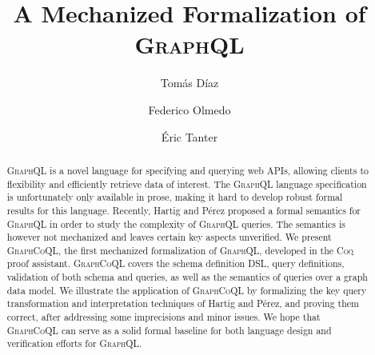 \documentclass[sigplan,10pt,anonymous,review,nonacm,screen]{acmart}
\newcommand{\plstyle}[1]{\mbox{\textsc{#1}}\xspace}
\newcommand{\gql}{\plstyle{GraphQL}}
\newcommand{\gcoql}{\plstyle{GraphCoQL}}
\newcommand{\coq}{\plstyle{Coq}}
\begin{document}
\title{A Mechanized Formalization of \gql}
\author{Tomás Díaz}

\author{Federico Olmedo}
\author{Éric Tanter}

\begin{abstract}
\gql is a novel language for specifying and querying web APIs,
allowing clients to flexibility and efficiently retrieve data of
interest. The \gql language specification is unfortunately only
available in prose, making it hard to develop robust formal results
for this language. Recently, Hartig and Pérez proposed a formal
semantics for \gql in order to study the complexity of \gql
queries. The semantics is however not mechanized and leaves certain key aspects unverified. We present \gcoql, the first mechanized formalization of \gql, developed in the \coq proof assistant.  \gcoql covers the schema definition DSL, query definitions, validation of both schema and queries, as well as the semantics of queries over a graph data model.
We illustrate the application of \gcoql by formalizing the key query transformation and interpretation techniques of Hartig and Pérez, and proving them correct, after addressing some imprecisions and minor issues. 
We hope that \gcoql can serve as a solid formal baseline for both language design and verification efforts for \gql.
\end{abstract}


\maketitle







% 
% 



\clearpage


\end{document}
